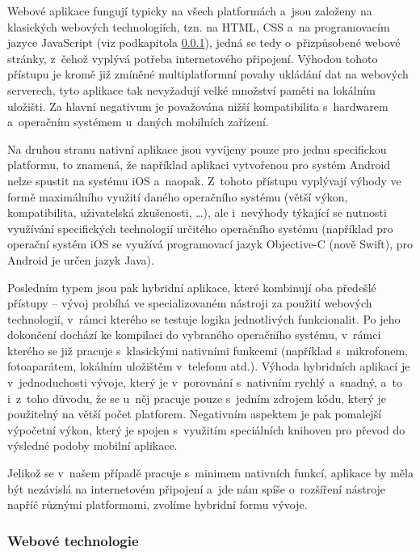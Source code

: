 Webové aplikace fungují typicky na všech platformách a~jsou založeny na
klasických webových technologiích, tzn. na HTML, CSS a~na programovacím
jazyce JavaScript (viz podkapitola \ref{webovuxe9-technologie}), jedná
se tedy o~přizpůsobené webové stránky, z~čehož vyplývá potřeba
internetového připojení. Výhodou tohoto přístupu je kromě již zmíněné
multiplatformní povahy ukládání dat na webových serverech, tyto aplikace
tak nevyžadují velké množství paměti na lokálním uložišti. Za hlavní
negativum je považována nižší kompatibilita s~hardwarem a~operačním
systémem u~daných mobilních zařízení.

Na druhou stranu nativní aplikace jsou vyvíjeny pouze pro jednu
specifickou platformu, to znamená, že například aplikaci vytvořenou pro
systém Android nelze spustit na systému iOS a~naopak. Z~tohoto přístupu
vyplývají výhody ve formě maximálního využití daného operačního systému
(větší výkon, kompatibilita, uživatelská zkušenosti, \ldots{}), ale
i~nevýhody týkající se nutnosti využívání specifických technologií
určitého operačního systému (například pro operační systém iOS se
využívá programovací jazyk Objective-C (nově Swift), pro Android je
určen jazyk Java).

Posledním typem jsou pak hybridní aplikace, které kombinují oba předešlé
přístupy -- vývoj probíhá ve specializovaném nástroji za použití
webových technologií, v~rámci kterého se testuje logika jednotlivých
funkcionalit. Po jeho dokončení dochází ke kompilaci do vybraného
operačního systému, v~rámci kterého se již pracuje s~klasickými
nativními funkcemi (například s~mikrofonem, fotoaparátem, lokálním
uložištěm v~telefonu atd.). Výhoda hybridních aplikací je
v~jednoduchosti vývoje, který je v~porovnání s~nativním rychlý a~snadný,
a~to i~z~toho důvodu, že se u~něj pracuje pouze s~jedním zdrojem kódu,
který je použitelný na větší počet platforem. Negativním aspektem je pak
pomalejší výpočetní výkon, který je spojen s~využitím speciálních
knihoven pro převod do výsledné podoby mobilní aplikace.

Jelikož se v~našem případě pracuje s~minimem nativních funkcí, aplikace
by měla být nezávislá na internetovém připojení a~jde nám spíše
o~rozšíření nástroje napříč různými platformami, zvolíme hybridní formu
vývoje.

\hypertarget{webovuxe9-technologie}{%
\subsubsection{Webové technologie}\label{webovuxe9-technologie}}

